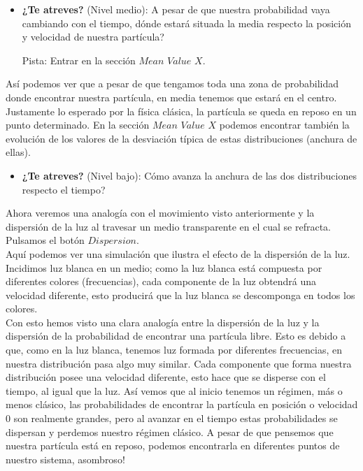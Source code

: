 \begin{itemize}
	\item \textbf{¿Te atreves?} (Nivel medio): A pesar de que nuestra probabilidad vaya cambiando con el tiempo, d\'onde estar\'a situada la media respecto la posici\'on y velocidad de nuestra part\'icula?
	
	Pista: Entrar en la secci\'on $Mean$ $Value$ $X$.
\end{itemize}


As\'i podemos ver que a pesar de que tengamos toda una zona de probabilidad donde encontrar nuestra part\'icula, en media tenemos que estar\'a en el centro. Justamente lo esperado por la f\'isica cl\'asica, la part\'icula se queda en reposo en un punto determinado. En la secci\'on $Mean$ $Value$ $X$ podemos encontrar tambi\'en la evoluci\'on de los valores de la desviaci\'on t\'ipica de estas distribuciones (anchura de ellas).
\\

\begin{itemize}
	\item \textbf{¿Te atreves?} (Nivel bajo): C\'omo avanza la anchura de las dos distribuciones respecto el tiempo?
\end{itemize}


Ahora veremos una analog\'ia con el movimiento visto anteriormente y la dispersi\'on de la luz al travesar un medio transparente en el cual se refracta. Pulsamos el bot\'on $Dispersion$.
\\

Aqu\'i podemos ver una simulaci\'on que ilustra el efecto de la dispersi\'on de la luz. Incidimos luz blanca en un medio; como la luz blanca est\'a compuesta por diferentes colores (frecuencias), cada componente de la luz obtendr\'a una velocidad diferente, esto producir\'a que la luz blanca se descomponga en todos los colores.
\\

Con esto hemos visto una clara analog\'ia entre la dispersi\'on de la luz y la dispersi\'on de la probabilidad de encontrar una part\'icula libre. Esto es debido a que, como en la luz blanca, tenemos luz formada por diferentes frecuencias, en nuestra distribuci\'on pasa algo muy similar. Cada componente que forma nuestra distribuci\'on posee una velocidad diferente, esto hace que se disperse con el tiempo, al igual que la luz. As\'i vemos que al inicio tenemos un r\'egimen, m\'as o menos cl\'asico, las probabilidades de encontrar la part\'icula en posici\'on o velocidad $0$ son realmente grandes, pero al avanzar en el tiempo estas probabilidades se dispersan y perdemos nuestro r\'egimen cl\'asico. A pesar de que pensemos que nuestra part\'icula est\'a en reposo, podemos encontrarla en diferentes puntos de nuestro sistema, asombroso!
